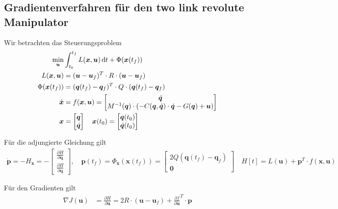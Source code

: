 \documentclass[a4paper, 12pt]{scrartcl}
\newcommand{\dt}{\thinspace \mathrm{d}t}
\begin{document}
\subsection{Gradientenverfahren für den two link revolute Manipulator}

Wir betrachten das Steuerungsproblem 
%
\begin{align*}
    \min_{\bm{u}} &\int_{t_0}^{t_f} L(\bm{x},\bm{u}) \dt + \Phi(\bm{x}(t_f)) \\
    L(\bm{x},\bm{u}) 
    &= 
    (\bm{u} - \bm{u}_f)^T \cdot R \cdot (\bm{u} - \bm{u}_f) \\ 
    \Phi(\bm{x}(t_f)) &= (\bm{q}(t_f) - \bm{q}_f)^T \cdot Q \cdot (\bm{q}(t_f) - \bm{q}_f) \\
    \dot{\bm{x}} &= f(\bm{x},\bm{u}) =  
    \begin{bmatrix}
        \dot{\bm{q}} \\
        M^{-1}(\bm{q}) \cdot ( - C(\bm{q},\dot{\bm{q}}) \cdot \dot{\bm{q}} - G(\bm{q}) + \bm{u} )
    \end{bmatrix}
    \\
    \bm{x} 
    &=
    \begin{bmatrix}
        \bm{q} \\
        \dot{\bm{q}}
    \end{bmatrix}
    \quad
    \bm{x}(t_0) =
    \begin{bmatrix}
        \bm{q}(t_0) \\
        \dot{\bm{q}}(t_0)
    \end{bmatrix}
\end{align*}

Für die adjungierte Gleichung gilt
%
\begin{align*}
    \dot{\bm{p}} = - H_{\bm{x}} 
    =
    -
    \begin{bmatrix}
        \frac{\partial H}{\partial \bm{q}} \\[6pt]
        \frac{\partial H}{\partial \dot{\bm{q}}}
    \end{bmatrix},
    \quad
    \bm{p}(t_f) = \Phi_{\bm{x}}(\bm{x}(t_f))
    = \begin{bmatrix}
        2 Q (\bm{q}(t_f) - \bm{q}_f) \\
        \bm{0}
    \end{bmatrix}
    \quad
    H[t] = L(\bm{u}) + \bm{p}^T \cdot f(\bm{x},\bm{u})
\end{align*}

Für den Gradienten gilt
%
\begin{align*}
    \nabla J(\bm{u}) 
    &= 
    \frac{\partial H}{\partial \bm{u}}
    =
    2 R \cdot (\bm{u} - \bm{u}_f) +
    \frac{\partial f}{\partial \bm{u}}^T \cdot \bm{p} 
\end{align*} 
\end{document}
